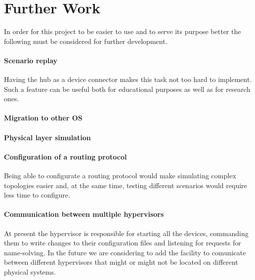 \chapter{Further Work}
\label{chapter:further}
In order for this project to be easier to use and to serve its purpose better the following must be considered for further development.
\subsubsection{Scenario replay}
\label{sec:scenario-replay}
Having the hub as a device connector makes this task not too hard to implement. Such a feature can be useful both for educational purposes as well as for research ones.
\subsubsection{Migration to other OS}
\label{sec:migration-os}

\subsubsection{Physical layer simulation}
\label{sec:physica-sim}

\subsubsection{Configuration of a routing protocol}
\label{sec:routing-prot}
Being able to configurate a routing protocol would make simulating complex topologies easier and, at the same time, testing different scenarios would require less time to configure. 

\subsubsection{Communication between multiple hypervisors}
\label{sec:hypervisor-comm}
At present the hypervisor is responsible for starting all the devices, commanding them to write changes to their configuration files and listening for requests for name-solving. In the future we are considering to add the facility to comunicate between different hypervisors that might or might not be located on different physical systems. 
